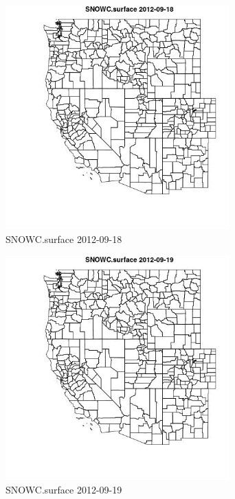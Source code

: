 \begin{figure} 
\centering  
\includegraphics[width=0.77\textwidth]{Code_Outputs/ML_input_report_ML_input_PM25_Step5_part_d_de_duplicated_aves_ML_input_MapObsSNOWCsurface2012-09-18.jpg} 
\caption{\label{fig:ML_input_report_ML_input_PM25_Step5_part_d_de_duplicated_aves_ML_inputMapObsSNOWCsurface2012-09-18}SNOWC.surface 2012-09-18} 
\end{figure} 
 

\begin{figure} 
\centering  
\includegraphics[width=0.77\textwidth]{Code_Outputs/ML_input_report_ML_input_PM25_Step5_part_d_de_duplicated_aves_ML_input_MapObsSNOWCsurface2012-09-19.jpg} 
\caption{\label{fig:ML_input_report_ML_input_PM25_Step5_part_d_de_duplicated_aves_ML_inputMapObsSNOWCsurface2012-09-19}SNOWC.surface 2012-09-19} 
\end{figure} 
 

